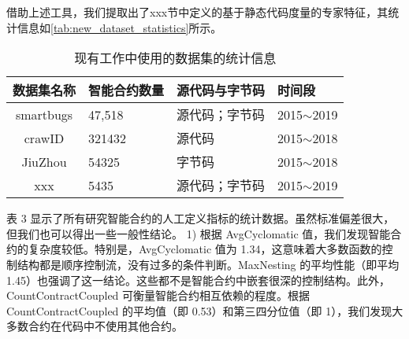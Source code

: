 借助上述工具，我们提取出了xxx节中定义的基于静态代码度量的专家特征，其统计信息如\autoref{tab:new_dataset_statistics}所示。
\begin{table}[htbp]
    \caption{\label{tab:new_dataset_statistics}现有工作中使用的数据集的统计信息}
    \small
    \renewcommand{\arraystretch}{1.5}
    \begin{tabularx}{\linewidth}{cX<{\centering}X<{\centering}X<{\centering}}
        \hline
    数据集名称     & 智能合约数量 & 源代码与字节码 & 时间段            \\ \hline
    smartbugs & 47,518  & 源代码；字节码 & 2015$\sim$2019 \\
    crawID    & 321432 & 源代码     & 2015$\sim$2018 \\
    JiuZhou   & 54325  & 字节码     & 2015$\sim$2018 \\
    xxx       & 5435   & 源代码；字节码 & 2015$\sim$2019  \\  \hline
    \end{tabularx}
\end{table}
表 3 显示了所有研究智能合约的人工定义指标的统计数据。虽然标准偏差很大，但我们也可以得出一些一般性结论。
1) 根据 AvgCyclomatic 值，我们发现智能合约的复杂度较低。特别是，AvgCyclomatic 值为 1.34，这意味着大多数函数的控制结构都是顺序控制流，没有过多的条件判断。MaxNesting 的平均性能（即平均 1.45）也强调了这一结论。这些都不是智能合约中嵌套很深的控制结构。此外，CountContractCoupled 可衡量智能合约相互依赖的程度。根据 CountContractCoupled 的平均值（即 0.53）和第三四分位值（即 1），我们发现大多数合约在代码中不使用其他合约。
